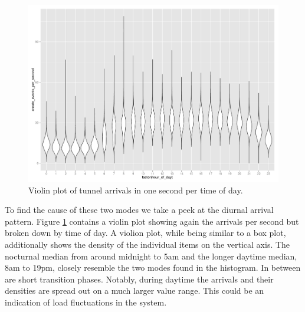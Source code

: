 \begin{figure}
	\centering
	\includegraphics[width=\columnwidth]{images/IMC2013/R-createspersecond-1h-violin.pdf}
	\caption{Violin plot of tunnel arrivals in one second per time of day.}
	\label{fig:freq-arrivals-per-second-violin}
\end{figure}

To find the cause of these two modes we take a peek at the diurnal arrival pattern. Figure \ref{fig:freq-arrivals-per-second-violin} contains a violin plot showing again the arrivals per second but broken down by time of day. A violion plot, while being similar to a box plot, additionally shows the density of the individual items on the vertical axis.
The nocturnal median from around midnight to 5am and the longer daytime median, 8am to 19pm, closely resemble the two modes found in the histogram. In between are short transition phases. Notably, during daytime the arrivals and their densities are spread out on a much larger value range. This could be an indication of load fluctuations in the system.



